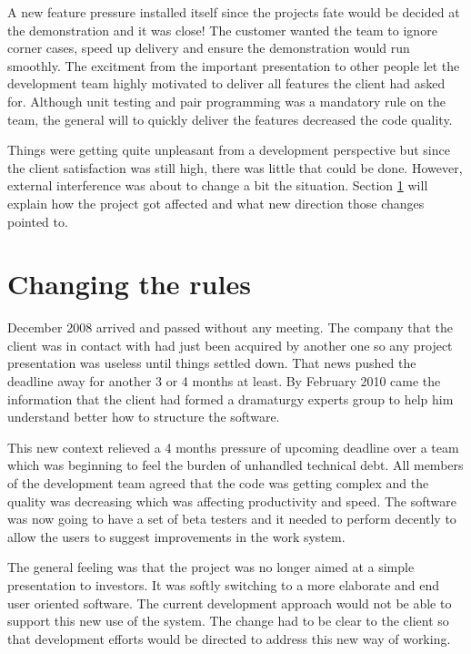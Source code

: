 \documentclass[lnbip]{svmultln}
\begin{document}
A new feature pressure installed itself since the projects fate would
be decided at the demonstration and it was close! The customer wanted
the team to ignore corner cases, speed up delivery and ensure the
demonstration would run smoothly. The excitment from the important
presentation to other people let the development team highly motivated
to deliver all features the client had asked for. Although unit
testing and pair programming was a mandatory rule on the team, the
general will to quickly deliver the features decreased the code
quality.

Things were getting quite unpleasant from a development perspective
but since the client satisfaction was still high, there was little
that could be done. However, external interference was about to change
a bit the situation. Section \ref{sec:changes} will explain how the
project got affected and what new direction those changes pointed to.

\section{Changing the rules}
\label{sec:changes}

December 2008 arrived and passed without any meeting. The company that
the client was in contact with had just been acquired by another one
so any project presentation was useless until things settled
down. That news pushed the deadline away for another 3 or 4 months at
least. By February 2010 came the information that the client had
formed a dramaturgy experts group to help him understand better how to
structure the software.

This new context relieved a 4 months pressure of upcoming deadline
over a team which was beginning to feel the burden of unhandled
technical debt. All members of the development team agreed that the
code was getting complex and the quality was decreasing which was
affecting productivity and speed. The software was now going to have a
set of beta testers and it needed to perform decently to allow the
users to suggest improvements in the work system.

The general feeling was that the project was no longer aimed at a
simple presentation to investors. It was softly switching to a more
elaborate and end user oriented software. The current development
approach would not be able to support this new use of the system. The
change had to be clear to the client so that development efforts would
be directed to address this new way of working.
\end{document}

